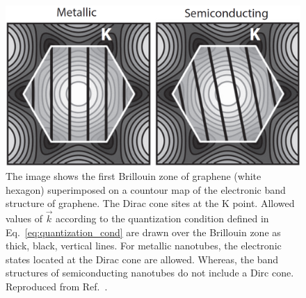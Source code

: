 \begin{figure}[h]
	\centering
	\includegraphics[scale=0.4]{images/chapter_optical_props/metal_semi_amori}
	\caption{The image shows the first Brillouin zone of graphene (white hexagon) superimposed on a countour map of the electronic band structure of graphene. The Dirac cone sites at the K point. Allowed values of $\vec{k}$ according to the quantization condition defined in Eq.\ \ref{eq:quantization_cond} are drawn over the Brillouin zone as thick, black, vertical lines. For metallic nanotubes, the electronic states located at the Dirac cone are allowed. Whereas, the band structures of semiconducting nanotubes do not include a Dirc cone. Reproduced from Ref.\ \cite{amori2018excitons}.}
	\label{fig:k_quant}
\end{figure}

